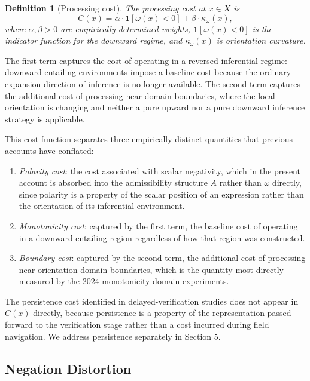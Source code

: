 \documentclass[12pt]{article}
\newtheorem{definition}[theorem]{Definition}
\theoremstyle{remark}
\begin{document}
\begin{definition}[Processing cost]
The \emph{processing cost} at $x \in X$ is
\[
C(x) = \alpha \cdot \mathbf{1}[\omega(x) < 0] + \beta \cdot
\kappa_\omega(x),
\]
where $\alpha, \beta > 0$ are empirically determined weights,
$\mathbf{1}[\omega(x) < 0]$ is the indicator function for the downward
regime, and $\kappa_\omega(x)$ is orientation curvature.
\end{definition}
The first term captures the cost of operating in a reversed inferential
regime: downward-entailing environments impose a baseline cost because
the ordinary expansion direction of inference is no longer available. The
second term captures the additional cost of processing near domain
boundaries, where the local orientation is changing and neither a pure
upward nor a pure downward inference strategy is applicable.

This cost function separates three empirically distinct quantities that
previous accounts have conflated:

\begin{enumerate}
\item \emph{Polarity cost}: the cost associated with scalar negativity,
which in the present account is absorbed into the admissibility structure
$A$ rather than $\omega$ directly, since polarity is a property of the
scalar position of an expression rather than the orientation of its
inferential environment.

\item \emph{Monotonicity cost}: captured by the first term, the baseline
cost of operating in a downward-entailing region regardless of how that
region was constructed.

\item \emph{Boundary cost}: captured by the second term, the additional
cost of processing near orientation domain boundaries, which is the
quantity most directly measured by the 2024 monotonicity-domain
experiments.
\end{enumerate}

The persistence cost identified in delayed-verification studies does not
appear in $C(x)$ directly, because persistence is a property of the
representation passed forward to the verification stage rather than a
cost incurred during field navigation. We address persistence separately
in Section 5.

\subsection{Negation Distortion}
\end{document}
